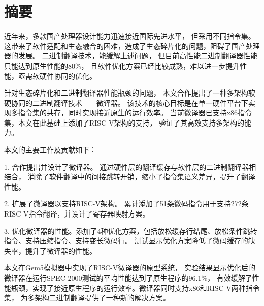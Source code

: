\maketitle%
\MAKETITLE%
\makedeclaration%
\intobmk\chapter*{摘\quad 要}%
\setcounter{page}{1}%


近年来，多款国产处理器设计能力迅速接近国际先进水平，
但采用不同指令集。
这带来了软件适配和生态融合的困难，造成了生态碎片化的问题，阻碍了国产处理器的发展。
二进制翻译技术，能缓解上述问题，
但目前高性能二进制翻译器性能只能达到原生性能的80\%，
且软件优化方案已经比较成熟，难以进一步提升性能，亟需软硬件协同的优化。

针对生态碎片化和二进制翻译器性能瓶颈的问题，
本文合作提出了一种多架构软硬协同的二进制翻译技术——微译器。
该技术的核心目标是在单一硬件平台下实现多指令集的共存，同时实现接近原生的运行效率。
当前微译器已支持x86指令集，本文在此基础上添加了RISC-V架构的支持，
验证了其高效支持多架构的能力。

本文的主要工作及贡献如下：

1. 合作提出并设计了微译器。
通过硬件层的翻译缓存与软件层的二进制翻译器相结合，
消除了软件翻译中的间接跳转开销，缩小了指令集语义差异，提升了翻译性能。

2. 扩展了微译器以支持RISC-V架构。
累计添加了51条微码指令用于支持272条RISC-V指令翻译，并设计了寄存器映射方案。

3. 优化微译器的性能。添加了4种优化方案，包括放松缓存行结尾、放松条件跳转指令、支持压缩指令、支持变长微码行。
测试显示优化方案降低了微码缓存的缺失率，提升了微译器的性能。

本文在Gem5模拟器中实现了RISC-V微译器的原型系统，
实验结果显示优化后的微译器在运行SPEC 2000测试的平均性能达到了原生程序的96.1\%，
有效缓解了性能瓶颈，实现了接近原生程序的运行效率。微译器同时支持x86和RISC-V两种指令集，
为多架构二进制翻译提供了一种新的解决方案。

